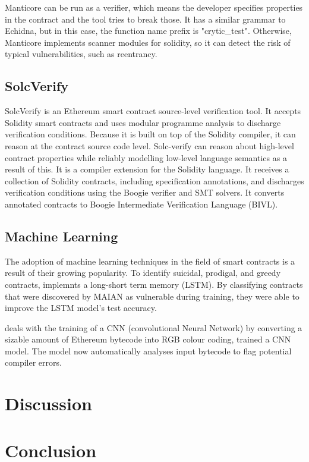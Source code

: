 \documentclass[a4paper,sigconf, language=french,
language=german, language=spanish, language=english]{acmart}
\begin{document}
Manticore can be run as a verifier, which means the developer specifies properties in the contract and the tool tries to break those. It has a similar grammar to Echidna, but in this case, the function name prefix is "crytic\_test". Otherwise, Manticore implements scanner modules for solidity, so it can detect the risk of typical vulnerabilities, such as reentrancy.

\subsection{SolcVerify} 
SolcVerify is an Ethereum smart contract source-level verification tool.
It accepts Solidity smart contracts and uses modular programme analysis to discharge verification conditions.
Because it is built on top of the Solidity compiler, it can reason at the contract source code level.
Solc-verify can reason about high-level contract properties while reliably modelling low-level language semantics as a result of this.
It is a compiler extension for the Solidity language.
It receives a collection of Solidity contracts, including specification annotations, and discharges verification conditions using the Boogie verifier and SMT solvers.
It converts annotated contracts to Boogie Intermediate Verification Language (BIVL).
\subsection{Machine Learning}
The adoption of machine learning techniques in the field of smart contracts is a result of their growing popularity. To identify suicidal, prodigal, and greedy contracts, \cite{MLAnalysis} implemnts a long-short term memory (LSTM).
By classifying contracts that were discovered by MAIAN as vulnerable during training, they were able to improve the LSTM model's test accuracy. 

\cite{CNNML} deals with the training of a CNN (convolutional Neural Network) by converting a sizable amount of Ethereum bytecode into RGB colour coding,  trained a CNN model. The model now automatically analyses input bytecode to flag potential compiler errors. 


\section{Discussion}
\label{Discussion}

\section{Conclusion}
\label{Conclusion}




\end{document}
